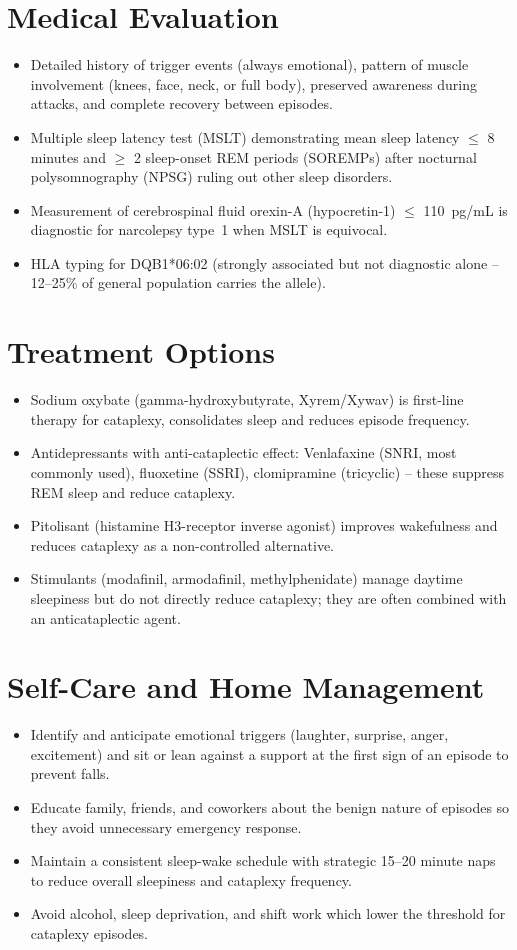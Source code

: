\section*{Medical Evaluation}
\begin{itemize}
 \item Detailed history of trigger events (always emotional), pattern of muscle involvement (knees, face, neck, or full body), preserved awareness during attacks, and complete recovery between episodes.
 \item Multiple sleep latency test (MSLT) demonstrating mean sleep latency $\le$ 8 minutes and $\ge$ 2 sleep-onset REM periods (SOREMPs) after nocturnal polysomnography (NPSG) ruling out other sleep disorders.
 \item Measurement of cerebrospinal fluid orexin-A (hypocretin-1) $\le$ 110~pg/mL is diagnostic for narcolepsy type~1 when MSLT is equivocal.
 \item HLA typing for DQB1*06:02 (strongly associated but not diagnostic alone -- 12--25\% of general population carries the allele).
\end{itemize}

\section*{Treatment Options}
\begin{itemize}
 \item Sodium oxybate (gamma-hydroxybutyrate, Xyrem/Xywav) is first-line therapy for cataplexy, consolidates sleep and reduces episode frequency.
 \item Antidepressants with anti-cataplectic effect: Venlafaxine (SNRI, most commonly used), fluoxetine (SSRI), clomipramine (tricyclic) -- these suppress REM sleep and reduce cataplexy.
 \item Pitolisant (histamine H3-receptor inverse agonist) improves wakefulness and reduces cataplexy as a non-controlled alternative.
 \item Stimulants (modafinil, armodafinil, methylphenidate) manage daytime sleepiness but do not directly reduce cataplexy; they are often combined with an anticataplectic agent.
\end{itemize}

\section*{Self-Care and Home Management}
\begin{itemize}
 \item Identify and anticipate emotional triggers (laughter, surprise, anger, excitement) and sit or lean against a support at the first sign of an episode to prevent falls.
 \item Educate family, friends, and coworkers about the benign nature of episodes so they avoid unnecessary emergency response.
 \item Maintain a consistent sleep-wake schedule with strategic 15--20 minute naps to reduce overall sleepiness and cataplexy frequency.
 \item Avoid alcohol, sleep deprivation, and shift work which lower the threshold for cataplexy episodes.
\end{itemize}

